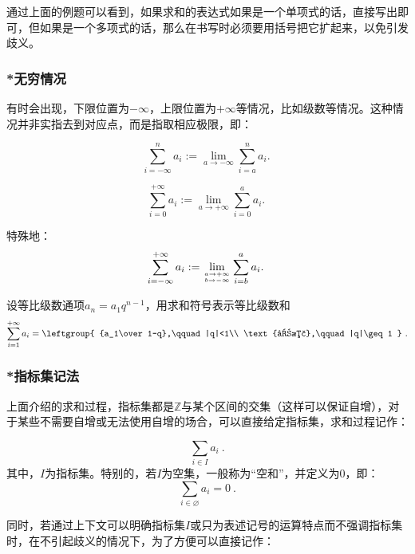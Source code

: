 通过上面的例题可以看到，如果求和的表达式如果是一个单项式的话，直接写出即可，但如果是一个多项式的话，那么在书写时必须要用括号把它扩起来，以免引发歧义。

\subsubsection{*无穷情况}
有时会出现，下限位置为$-\infty$，上限位置为$+\infty$等情况，比如级数等情况。这种情况并非实指去到对应点，而是指取相应极限，即：

\begin{equation}
\sum_{i=-\infty}^n a_i:= \lim_{a\to-\infty}\sum_{i=a}^n a_i.~
\end{equation}

\begin{equation}
\sum_{i=0}^{+\infty} a_i:= \lim_{a\to+\infty}\sum_{i=0}^a a_i.~
\end{equation}

特殊地：
\begin{equation}
\sum_{i=-\infty}^{+\infty} a_i:= \lim_{a\to+\infty\atop b\to-\infty}\sum_{i=b}^a a_i.~
\end{equation}

\begin{example}
{设等比级数通项$a_n=a_1q^{n-1}$，用求和符号表示等比级数和}
$$
\sum_{i=1}^{+\infty} a_i=
\leftgroup{
{a_1\over 1-q},\qquad |q|<1\\  
\text{发散},\qquad |q|\geq1
} ~.
$$
\end{example}

\subsubsection{*指标集记法}

上面介绍的求和过程，指标集都是$\mathbb{Z}$与某个区间的交集（这样可以保证自增），对于某些不需要自增或无法使用自增的场合，可以直接给定指标集，求和过程记作：

\begin{equation}
\sum_{i\in I} a_i~.
\end{equation}
其中，$I$为指标集。特别的，若$I$为空集，一般称为“空和”，并定义为0，即：
\begin{equation}
\label{eq_SumSym_5}
\sum_{i\in \varnothing} a_i=0~.
\end{equation}

同时，若通过上下文可以明确指标集$I$或只为表述记号的运算特点而不强调指标集时，在不引起歧义的情况下，为了方便可以直接记作：


